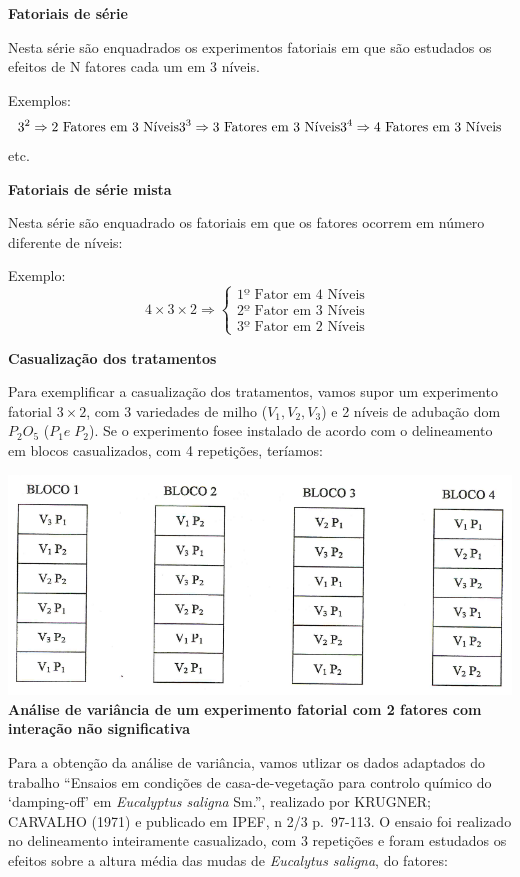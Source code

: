 \documentclass[
]{book}
\begin{document}
\textbf{Fatoriais de série}

Nesta série são enquadrados os experimentos fatoriais em que são estudados os efeitos de N fatores cada um em 3 níveis.

Exemplos:
\[
3^2 \Rightarrow \text{2 Fatores em 3 Níveis} \\
3^3 \Rightarrow \text{3 Fatores em 3 Níveis} \\
3^4 \Rightarrow \text{4 Fatores em 3 Níveis} \\
\]
etc.

\textbf{Fatoriais de série mista}

Nesta série são enquadrado os fatoriais em que os fatores ocorrem em número diferente de níveis:

Exemplo:
\[
4\times 3\times 2 \Rightarrow \begin{cases} \text{1º Fator em 4 Níveis }\\ \text{2º Fator em 3 Níveis } \\ \text{3º Fator em 2 Níveis } \end{cases}
\]

\textbf{Casualização dos tratamentos}

Para exemplificar a casualização dos tratamentos, vamos supor um experimento fatorial \(3 \times 2\), com 3 variedades de milho (\(V_1,V_2,V_3\)) e 2 níveis de adubação dom \(P_2O_5\) (\(P_1 e\; P_2\)). Se o experimento fosee instalado de acordo com o delineamento em blocos casualizados, com 4 repetições, teríamos:

\includegraphics{Casuali.png}
\textbf{Análise de variância de um experimento fatorial com 2 fatores com interação não significativa}

Para a obtenção da análise de variância, vamos utlizar os dados adaptados do trabalho ``Ensaios em condições de casa-de-vegetação para controlo químico do `damping-off' em \emph{Eucalyptus saligna} Sm.'', realizado por KRUGNER; CARVALHO (1971) e publicado em IPEF, n 2/3 p.~97-113. O ensaio foi realizado no delineamento inteiramente casualizado, com 3 repetições e foram estudados os efeitos sobre a altura média das mudas de \emph{Eucalytus saligna}, do fatores:
\end{document}
